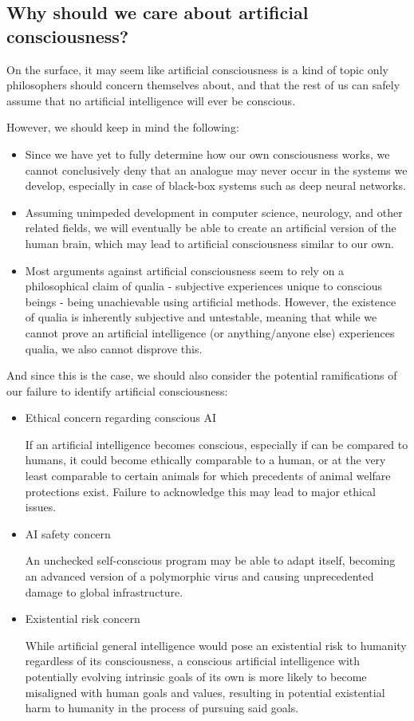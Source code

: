 \documentclass[masterthesis]{fer}
\begin{document}
\subsection{Why should we care about artificial consciousness?}
On the surface, it may seem like artificial consciousness is a kind of topic only philosophers should concern themselves about, and that the rest of us can safely assume that no artificial intelligence will ever be conscious.

However, we should keep in mind the following:
\begin{itemize}
\item{Since we have yet to fully determine how our own consciousness works, we cannot conclusively deny that an analogue may never occur in the systems we develop, especially in case of black-box systems such as deep neural networks.}
\item{Assuming unimpeded development in computer science, neurology, and other related fields, we will eventually be able to create an artificial version of the human brain, which may lead to artificial consciousness similar to our own.}
\item{Most arguments against artificial consciousness seem to rely on a philosophical claim of qualia - subjective experiences unique to conscious beings - being unachievable using artificial methods. However, the existence of qualia is inherently subjective and untestable, meaning that while we cannot prove an artificial intelligence (or anything/anyone else) experiences qualia, we also cannot disprove this.}
\end{itemize}
And since this is the case, we should also consider the potential ramifications of our failure to identify artificial consciousness:
\begin{itemize}
\item{Ethical concern regarding conscious AI}

If an artificial intelligence becomes conscious, especially if can be compared to humans, it could become ethically comparable to a human, or at the very least comparable to certain animals for which precedents of animal welfare protections exist. Failure to acknowledge this may lead to major ethical issues.
\item{AI safety concern}

An unchecked self-conscious program may be able to adapt itself,
becoming an advanced version of a polymorphic virus and causing unprecedented damage to global infrastructure.
\item{Existential risk concern}

While artificial general intelligence would pose an existential risk to humanity regardless of its consciousness, a conscious artificial intelligence with potentially evolving intrinsic goals of its own is more likely to become misaligned with human goals and values, resulting in potential existential harm to humanity in the process of pursuing said goals.
\end{itemize}
\end{document}
